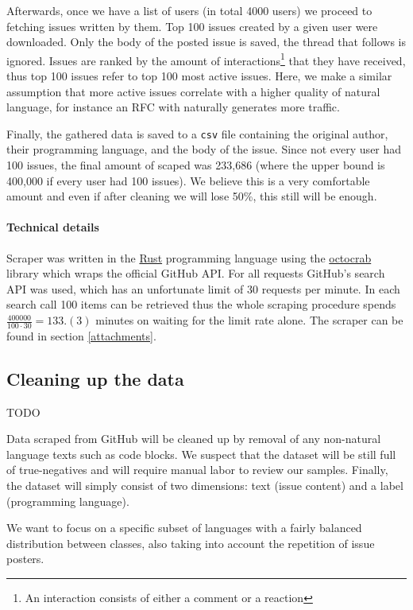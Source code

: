 \documentclass[]{article}
\newcommand{\code}[1]{\texttt{#1}}
\begin{document}
Afterwards, once we have a list of users (in total 4000 users) we proceed to fetching issues written by them. Top 100 issues created by a given user were downloaded. Only the body of the posted issue is saved, the thread that follows is ignored. Issues are ranked by the amount of interactions\footnote{An interaction consists of either a comment or a reaction} that they have received, thus top 100 issues refer to top 100 most active issues. Here, we make a similar assumption that more active issues correlate with a higher quality of natural language, for instance an RFC with naturally generates more traffic.

Finally, the gathered data is saved to a \code{csv} file containing the original author, their programming language, and the body of the issue. Since not every user had 100 issues, the final amount of scaped was 233,686 (where the upper bound is 400,000 if every user had 100 issues). We believe this is a very comfortable amount and even if after cleaning we will lose 50\%, this still will be enough.

\paragraph{Technical details}

Scraper was written in the \href{https://www.rust-lang.org/}{Rust} programming language using the \href{https://github.com/XAMPPRocky/octocrab}{octocrab} library which wraps the official GitHub API. For all requests GitHub's search API was used, which has an unfortunate limit of 30 requests per minute. In each search call 100 items can be retrieved thus the whole scraping procedure spends $\frac{400000}{100 \cdot 30} = 133.(3)$ minutes on waiting for the limit rate alone. The scraper can be found in section \ref{attachments}.

\subsection{Cleaning up the data}

TODO


Data scraped from GitHub will be cleaned up by removal of any non-natural language texts such as code blocks. We suspect that the dataset will be still full of true-negatives and will require manual labor to review our samples. Finally, the dataset will simply consist of two dimensions: text (issue content) and a label (programming language).

We want to focus on a specific subset of languages with a fairly balanced distribution between classes, also taking into account the repetition of issue posters.
\end{document}
